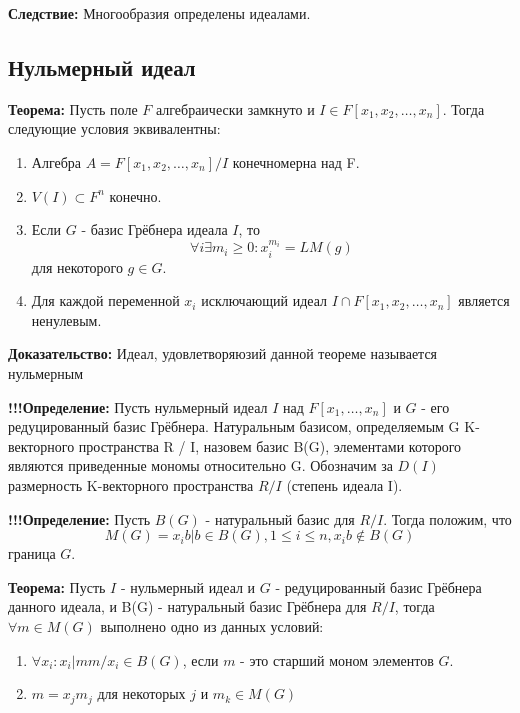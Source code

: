 \documentclass{article}
\begin{document}
    \textbf{Следствие:} Многообразия определены идеалами.

    \newpage

    \subsection{Нульмерный идеал}

    \textbf{Теорема:} Пусть поле $F$ алгебраически замкнуто и $I\in F[x_1, x_2,\ldots, x_n]$.
       Тогда следующие условия эквивалентны:
        
        \begin{enumerate}
            \item Алгебра $A=F[x_1, x_2,\ldots, x_n]/I$ конечномерна над F.
            \item $V(I) \subset F^n$ конечно.
            \item Если $G$ - базис Грёбнера идеала $I$, то $$\forall i \exists m_i \geq 0 : x_i^{m_i} = LM(g)$$ для некоторого $g \in G$.
            \item Для каждой переменной $x_i$ исключающий идеал $I \cap F[x_1, x_2,\ldots, x_n]$ является ненулевым.
        \end{enumerate}

        \textbf{Доказательство:}
      Идеал, удовлетворяюзий данной теореме называется нульмерным

    \newpage
    \textbf{!!!Определение:} Пусть нульмерный идеал $I$ над $F[x_1,\ldots,x_n]$ и $G$ - его редуцированный базис Грёбнера.
    Натуральным базисом, определяемым G K-векторного пространства R / I, назовем базис B(G),
    элементами которого являются приведенные мономы относительно G. Обозначим за $D(I)$ размерность K-векторного пространства $R/I$
    (степень идеала I). 

    \textbf{!!!Определение:} Пусть $B(G)$ - натуральный базис для $R/I$. Тогда положим, что
    $$M(G) = {x_ib | b \in B(G), 1\leq i \leq n, x_ib \notin B(G)}$$ граница $G$.

    \newpage

    \textbf{Теорема:} Пусть $I$ - нульмерный идеал и $G$ - редуцированный базис Грёбнера данного идеала, и
    B(G) - натуральный базис Грёбнера для $R/I$, тогда $\forall m \in M(G)$ выполнено одно из данных условий:

    \begin{enumerate}
        \item $\forall x_i : x_i | m m/x_i \in B(G)$, если $m$ - это старший моном элементов $G$.
        \item $m = x_jm_j$ для некоторых $j$ и $m_k \in M(G)$
    \end{enumerate}
\end{document}
